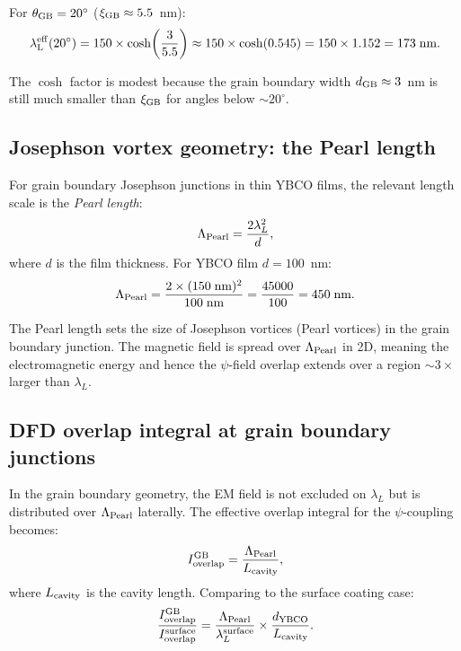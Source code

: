 \documentclass[11pt]{article}
\newcommand{\lambdaL}{\lambda_{\rm L}}
\begin{document}
For $\theta_{\rm GB} = 20^\circ$ ($\xi_{\rm GB} \approx 5.5$~nm):
\begin{equation}
\lambdaL^{\rm eff}(20^\circ) = 150 \times \cosh\!\left(\frac{3}{5.5}\right)
\approx 150 \times \cosh(0.545) = 150 \times 1.152 = 173\;\text{nm}.
\label{eq:lambdaL-20deg}
\end{equation}

The $\cosh$ factor is modest because the grain boundary width
$d_{\rm GB} \approx 3$~nm is still much smaller than $\xi_{\rm GB}$ for
angles below $\sim 20^\circ$.

\subsection{Josephson vortex geometry: the Pearl length}

For grain boundary Josephson junctions in thin YBCO films, the relevant
length scale is the \emph{Pearl length}:
\begin{equation}
\Lambda_{\rm Pearl} = \frac{2\lambda_L^2}{d},
\label{eq:Pearl}
\end{equation}
where $d$ is the film thickness. For YBCO film $d = 100$~nm:
\begin{equation}
\Lambda_{\rm Pearl} = \frac{2 \times (150\;\text{nm})^2}{100\;\text{nm}}
= \frac{45000}{100} = 450\;\text{nm}.
\label{eq:Pearl-YBCO}
\end{equation}

The Pearl length sets the size of Josephson vortices (Pearl vortices) in
the grain boundary junction. The magnetic field is spread over $\Lambda_{\rm Pearl}$
in 2D, meaning the electromagnetic energy and hence the $\psi$-field overlap
extends over a region $\sim 3\times$ larger than $\lambda_L$.

\subsection{DFD overlap integral at grain boundary junctions}

In the grain boundary geometry, the EM field is not excluded on $\lambda_L$
but is distributed over $\Lambda_{\rm Pearl}$ laterally. The effective
overlap integral for the $\psi$-coupling becomes:
\begin{equation}
I_{\rm overlap}^{\rm GB} = \frac{\Lambda_{\rm Pearl}}{L_{\rm cavity}},
\label{eq:overlap-GB}
\end{equation}
where $L_{\rm cavity}$ is the cavity length. Comparing to the surface
coating case:
\begin{equation}
\frac{I_{\rm overlap}^{\rm GB}}{I_{\rm overlap}^{\rm surface}}
= \frac{\Lambda_{\rm Pearl}}{\lambda_L^{\rm surface}} \times \frac{d_{\rm YBCO}}{L_{\rm cavity}}.
\label{eq:overlap-ratio}
\end{equation}
\end{document}
